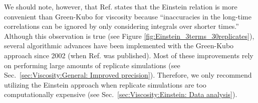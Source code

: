 \documentclass[9pt,bestpractices]{livecoms}
\begin{document}
We should note, however, that Ref. \cite{Hess2002} states that the Einstein relation is more convenient than Green-Kubo for viscosity because ``inaccuracies in the long-time correlations can be ignored by only considering integrals over shorter times.'' 
Although this observation is true (see Figure \ref{fig:Einstein_3terms_30replicates}), several algorithmic advances have been implemented with the Green-Kubo approach since 2002 (when Ref. \cite{Hess2002} was published). Most of these improvements rely on performing large amounts of replicate simulations (see Sec.\ \ref{sec:Viscosity:General: Improved precision}). Therefore, we only recommend utilizing the Einstein approach when replicate simulations are too computationally expensive (see Sec.\ \ref{sec:Viscosity:Einstein: Data analysis}).  


\end{document}
